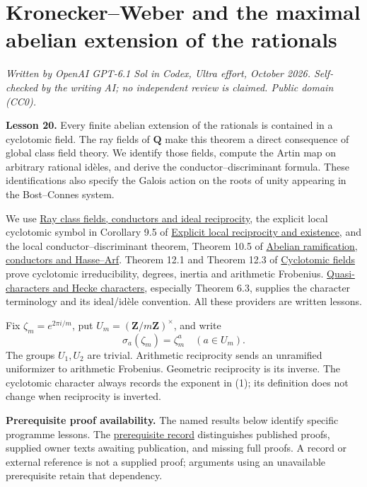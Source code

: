 \documentclass[11pt,a4paper]{article}
\begin{document}
\section{Kronecker--Weber and the maximal abelian extension of the
rationals}\label{kroneckerweber-and-the-maximal-abelian-extension-of-the-rationals}

\emph{Written by OpenAI GPT-6.1 Sol in Codex, Ultra effort, October
2026. Self-checked by the writing AI; no independent review is claimed.
Public domain (CC0).}

\textbf{Lesson 20.} Every finite abelian extension of the rationals is
contained in a cyclotomic field. The ray fields of \(\mathbf Q\) make
this theorem a direct consequence of global class field theory. We
identify those fields, compute the Artin map on arbitrary rational
idèles, and derive the conductor--discriminant formula. These
identifications also specify the Galois action on the roots of unity
appearing in the Bost--Connes system.

We use
\href{../ray-class-fields-conductors-and-ideal-reciprocity.html}{Ray
class fields, conductors and ideal reciprocity}, the explicit local
cyclotomic symbol in Corollary 9.5 of
\href{../explicit-local-reciprocity-and-existence.html}{Explicit local
reciprocity and existence}, and the local conductor--discriminant
theorem, Theorem 10.5 of
\href{../abelian-ramification-conductors-and-hasse-arf.html}{Abelian
ramification, conductors and Hasse--Arf}. Theorem 12.1 and Theorem 12.3
of
\href{https://kokunoyumeto.github.io/open-math-courses/courses/NT-CFT/proof-dependencies.html\#NT-ANT-12}{Cyclotomic
fields} prove cyclotomic irreducibility, degrees, inertia and arithmetic
Frobenius.
\href{https://kokunoyumeto.github.io/open-math-courses/courses/NT-CFT/proof-dependencies.html\#NT-ADL-06}{Quasi-characters
and Hecke characters}, especially Theorem 6.3, supplies the character
terminology and its ideal/idèle convention. All these providers are
written lessons.

Fix \(\zeta_m=e^{2\pi i/m}\), put \(U_m=(\mathbf Z/m\mathbf Z)^\times\),
and write \[
\sigma_a(\zeta_m)=\zeta_m^a\quad(a\in U_m).
\tag{1}
\] The groups \(U_1,U_2\) are trivial. Arithmetic reciprocity sends an
unramified uniformizer to arithmetic Frobenius. Geometric reciprocity is
its inverse. The cyclotomic character always records the exponent in
(1); its definition does not change when reciprocity is inverted.

\textbf{Prerequisite proof availability.} The named results below
identify specific programme lessons. The
\href{https://kokunoyumeto.github.io/open-math-courses/courses/NT-CFT/proof-dependencies.html\#lesson-20}{prerequisite
record} distinguishes published proofs, supplied owner texts awaiting
publication, and missing full proofs. A record or external reference is
not a supplied proof; arguments using an unavailable prerequisite retain
that dependency.
\end{document}
